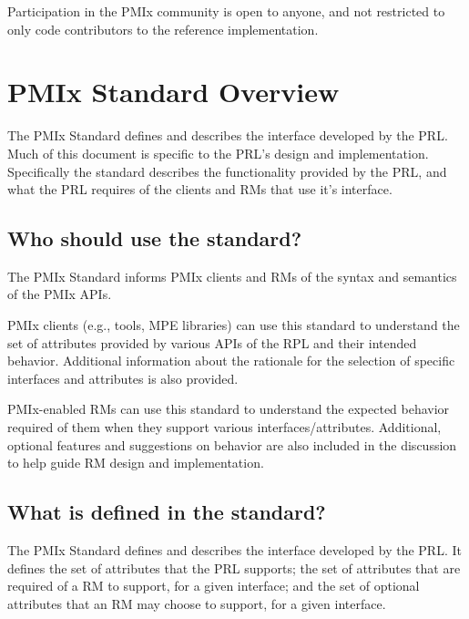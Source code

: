 Participation in the \ac{PMIx} community is open to anyone, and not restricted to only code contributors to the reference implementation.


\section{PMIx Standard Overview}
\label{chap:intro:std_overview}

The \ac{PMIx} Standard defines and describes the interface developed by the \acf{PRL}.
Much of this document is specific to the \acf{PRL}'s design and implementation.
Specifically the standard describes the functionality provided by the \ac{PRL}, and what the \ac{PRL} requires of the clients and \acfp{RM} that use it's interface.

\subsection{Who should use the standard?}

The \ac{PMIx} Standard informs PMIx clients and \acp{RM} of the syntax and semantics of the \ac{PMIx} APIs.

\ac{PMIx} clients (e.g., tools, \ac{MPE} libraries) can use this standard to understand the set of attributes provided by various APIs of the \ac{RPL} and their intended behavior.
Additional information about the rationale for the selection of specific interfaces and attributes is also provided.

\ac{PMIx}-enabled \acp{RM} can use this standard to understand the expected behavior required of them when they support various interfaces/attributes.
Additional, optional features and suggestions on behavior are also included in the discussion to help guide \ac{RM} design and implementation.

\subsection{What is defined in the standard?}

The \ac{PMIx} Standard defines and describes the interface developed by the \acf{PRL}.
It defines the set of attributes that the \ac{PRL} supports; the set of attributes that are required of a \ac{RM} to support, for a given interface; and the set of optional attributes that an \ac{RM} may choose to support, for a given interface.

